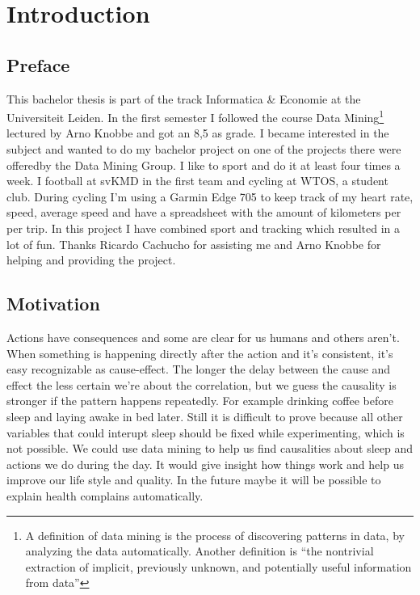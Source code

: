 \section{Introduction}
	\subsection{Preface}
		This bachelor thesis is part of the track Informatica \& Economie at the Universiteit Leiden. In the first semester I followed the course Data Mining\footnote{A definition of data mining is the process of discovering patterns in data, by analyzing the data automatically\cite{datamining}. Another definition is ``the nontrivial extraction of implicit, previously unknown, and potentially useful information from data''\cite{frawley}} lectured by Arno Knobbe and got an 8,5 as grade. I became interested in the subject and wanted to do my bachelor project on one of the projects there were offeredby the Data Mining Group. I like to sport and do it at least four times a week. I football at svKMD in the first team and cycling at WTOS, a student club. During cycling I'm using a Garmin Edge 705 to keep track of my heart rate, speed, average speed and have a spreadsheet with the amount of kilometers per per trip. In this project I have combined sport and tracking which resulted in a lot of fun. Thanks Ricardo Cachucho for assisting me and Arno Knobbe for helping and providing the project.

	\subsection{Motivation}
		\label{seq:motivation}
		Actions have consequences and some are clear for us humans and others aren't. When something is happening directly after the action and it's consistent, it's easy recognizable as cause-effect. The longer the delay between the cause and effect the less certain we're about the correlation, but we guess the causality is stronger if the pattern happens repeatedly. For example drinking coffee before sleep and laying awake in bed later. Still it is difficult to prove because all other variables that could interupt sleep should be fixed while experimenting, which is not possible. We could use data mining to help us find causalities about sleep and actions we do during the day. It would give insight how things work and help us improve our life style and quality. In the future maybe it will be possible to explain health complains automatically.

